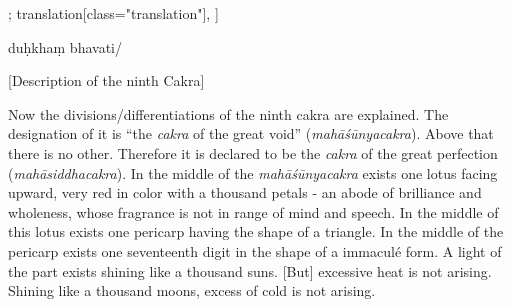 \documentclass[12pt]{article}%
\def\om{\textrm{\footnotesize \textit{omitted in}\ }} %
\begin{document}
\begin{alignment}[
    texts=edition[class="edition"];
    translation[class="translation"],
  ]
\begin{edition}
\begin{prose}
%
duḥkhaṃ
\app{\lem[wit={E,P,N1,N2,D1,U1,U2}]{na}
  \rdg[wit={B,L}]{\om}}
bhavati/
 \end{prose}
\end{edition}
\begin{translation}
   \bigskip
    \centerline{\textrm{\small{[Description of the ninth Cakra]}}}
    \bigskip
  \begin{tlate}
    Now the divisions/differentiations of the ninth cakra are explained. The designation of it is ``the \textit{cakra} of the great void'' (\textit{mahāśūnyacakra}). Above that there is no other. Therefore it is declared to be the \textit{cakra} of the great perfection (\textit{mahāsiddhacakra}). In the middle of the \textit{mahāśūnyacakra} exists one lotus facing upward, very red in color with a thousand petals - an abode of brilliance and wholeness, whose fragrance is not in range of mind and speech. In the middle of this lotus exists one pericarp having the shape of a triangle. In the middle of the pericarp exists one seventeenth digit in the shape of a immaculé form. A light of the part exists shining like a thousand suns. [But] excessive heat is not arising. Shining like a thousand moons, excess of cold is not arising.

\end{tlate}
\end{translation}
\end{alignment}
\end{document}
